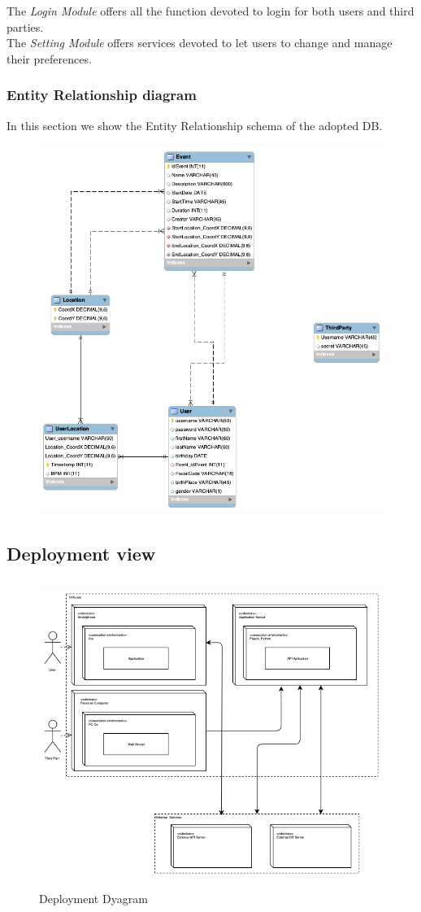 \documentclass[DD.tex]{subfiles}
\begin{document}
The \textit{Login Module} offers all the function devoted to login for both users and third parties.\\
The \textit{Setting Module} offers services devoted to let users to change and manage their preferences.



\newpage
\subsubsection{Entity Relationship diagram}
In this section we show the Entity Relationship schema of the adopted DB.
\begin{figure}[h!]
	\centering
	\includegraphics[height=12.00cm,keepaspectratio]{Figures/er-schema}
\end{figure}


\newpage
\subsection{Deployment view}

\begin{figure}[h!]
	\centering
	\includegraphics[height=10.00cm,keepaspectratio]{Figures/DeploymentDiagram}
	\caption{Deployment Dyagram}
\end{figure}
\end{document}
